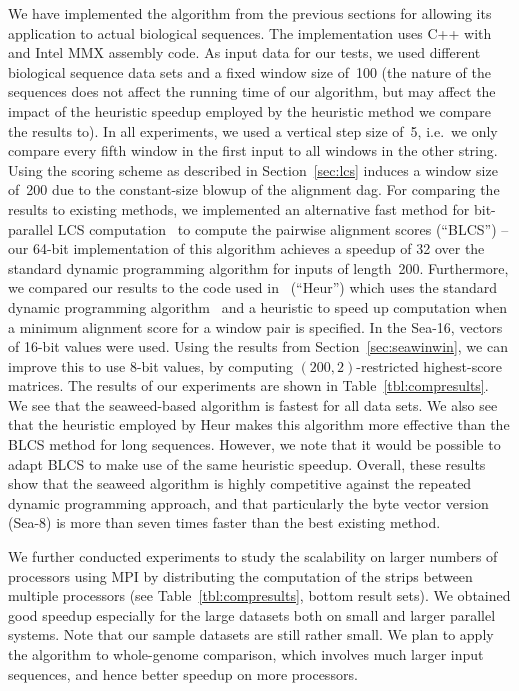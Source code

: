 \documentclass{IOS-Book-Article}     \usepackage{amsmath}
\theoremstyle{plain}
\theoremstyle{definition}
\begin{document}
We have implemented the algorithm from the previous sections for allowing its
application to actual biological sequences. The implementation uses C++ with
and Intel MMX assembly code. 
As input data for our tests, we used different biological sequence data sets 
and a fixed window size of~100 (the nature of the sequences does not affect the
running time of our algorithm, but may affect the impact of the heuristic
speedup employed by the heuristic method we compare the results to). In all
experiments, we used a vertical step size of~5, i.e.\ we only compare every
fifth window in the first input to all windows in the other string. Using the
scoring scheme as described in Section~\ref{sec:lcs} induces a window size
of~200 due to the constant-size blowup of the alignment dag.
For comparing the results to existing methods, we implemented an alternative
fast method for bit-parallel LCS computation~\cite{Crochemore+:01} 
to compute the pairwise alignment scores (``BLCS'') -- our 64-bit
implementation of this algorithm achieves a speedup of 32 over the
standard dynamic programming algorithm for inputs of length~200. 
Furthermore, we compared our results to the code used
in~\cite{Ott:09} (``Heur'') which uses the standard dynamic programming 
algorithm~\cite{Wagner+:74,Needleman1} and a heuristic to speed up computation 
when a minimum alignment score for a window pair is specified. In
the Sea-16, vectors of 16-bit values were used. Using the results from
Section~\ref{sec:seawinwin}, we can improve this to use 8-bit values, by
computing $(200,2)$-restricted highest-score matrices.
The results of our experiments are shown in Table~\ref{tbl:compresults}.
We see that the seaweed-based algorithm is fastest for all data sets. We also
see that the heuristic employed by Heur makes this algorithm more
effective than the BLCS method for long sequences. However, we note that
it would be possible to adapt BLCS to make use of the same heuristic
speedup. Overall, these results show that the seaweed algorithm
is highly competitive against the repeated dynamic programming approach, and
that particularly the byte vector version (Sea-8) is more than seven times
faster than the best existing method.

We further conducted experiments to study the scalability on larger numbers of
processors using MPI by distributing the computation of the strips between
multiple processors (see Table~\ref{tbl:compresults}, bottom result sets). 
We obtained good speedup especially for the large
datasets both on small and larger parallel systems. 
Note that our sample datasets are still rather small. We plan to apply the
algorithm to whole-genome comparison, which involves much larger input
sequences, and hence better speedup on more processors.
\end{document}
